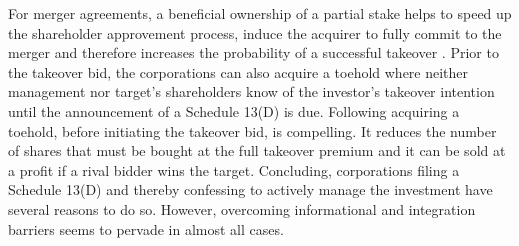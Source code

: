 \documentclass[12pt]{article}
\begin{document}
For merger agreements, a beneficial ownership of a partial stake helps to speed up the shareholder approvement process, induce the acquirer to fully commit to the merger and therefore increases the probability of a successful takeover \citep[p.19]{Betton2008}.
Prior to the takeover bid, the corporations can also acquire a toehold where neither management nor target's shareholders know of the investor's takeover intention until the announcement of a Schedule 13(D) is due. Following \citet[p.158]{Eckbo2009} acquiring a toehold, before initiating the takeover bid, is compelling. It reduces the number of shares that must be bought at the full takeover premium and it can be sold at a profit if a rival bidder wins the target. 
Concluding, corporations filing a Schedule 13(D) and thereby confessing to actively manage the investment have several reasons to do so. However, overcoming informational and integration barriers seems to pervade in almost all cases.
\end{document}
